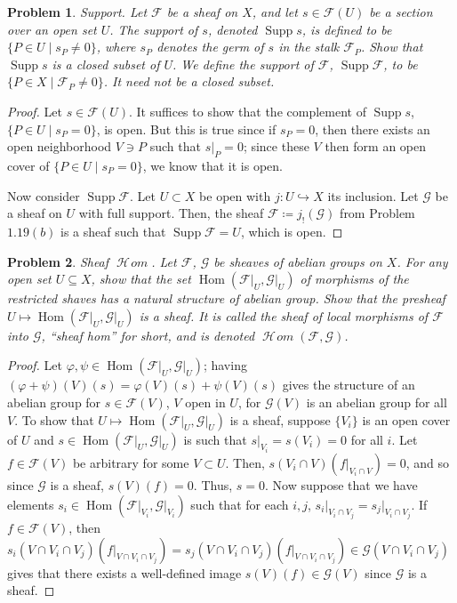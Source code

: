 \documentclass[12pt,letterpaper]{article}
\newtheorem{problem}{Problem}[section]
\theoremstyle{definition}
\theoremstyle{remark}
\numberwithin{equation}{section}
\numberwithin{figure}{problem}
\DeclareMathOperator{\Supp}{Supp}
\DeclareMathOperator{\Hom}{Hom}
\DeclareMathOperator{\HHom}{\mathscr{H}\!\mathit{om}}
\begin{document}
\begin{problem}
  \emph{Support}. Let $\mathscr{F}$ be a sheaf on $X$, and let $s \in \mathscr{F}(U)$ be a section over an open set $U$. The \emph{support} of $s$, denoted $\Supp s$, is defined to be $\{P \in U \mid s_P \ne 0\}$, where $s_P$ denotes the germ of $s$ in the stalk $\mathscr{F}_P$. Show that $\Supp s$ is a closed subset of $U$. We define the \emph{support} of $\mathscr{F}$, $\Supp \mathscr{F}$, to be $\{P \in X \mid \mathscr{F}_P \ne 0\}$. It need not be a closed subset.
\end{problem}
\begin{proof}
  Let $s \in \mathscr{F}(U)$. It suffices to show that the complement of $\Supp s$, $\{P \in U \mid s_P = 0\}$, is open. But this is true since if $s_P = 0$, then there exists an open neighborhood $V \ni P$ such that $s\vert_P = 0$; since these $V$ then form an open cover of $\{P \in U \mid s_P = 0\}$, we know that it is open.
  \par Now consider $\Supp\mathscr{F}$. Let $U \subset X$ be open with $j\colon U \hookrightarrow X$ its inclusion. Let $\mathscr{G}$ be a sheaf on $U$ with full support. Then, the sheaf $\mathscr{F} \coloneqq j_!(\mathscr{G})$ from Problem $1.19(b)$ is a sheaf such that $\Supp\mathscr{F} = U$, which is open.
\end{proof}

\begin{problem}
  \emph{Sheaf $\HHom$}. Let $\mathscr{F}$, $\mathscr{G}$ be sheaves of abelian groups on $X$. For any open set $U \subseteq X$, show that the set $\Hom(\mathscr{F}\vert_U,\mathscr{G}\vert_U)$ of morphisms of the restricted shaves has a natural structure of abelian group. Show that the presheaf $U \mapsto \Hom(\mathscr{F}\vert_U,\mathscr{G}\vert_U)$ is a sheaf. It is called the \emph{sheaf of local morphisms} of $\mathscr{F}$ into $\mathscr{G}$, ``sheaf hom'' for short, and is denoted $\HHom(\mathscr{F},\mathscr{G})$.
\end{problem}
\begin{proof}
  Let $\varphi,\psi \in \Hom(\mathscr{F}\vert_U,\mathscr{G}\vert_U)$; having $(\varphi + \psi)(V)(s) = \varphi(V)(s) + \psi(V)(s)$ gives the structure of an abelian group for $s \in \mathscr{F}(V)$, $V$ open in $U$, for $\mathscr{G}(V)$ is an abelian group for all $V$. To show that $U \mapsto \Hom(\mathscr{F}\vert_U,\mathscr{G}\vert_U)$ is a sheaf, suppose $\{V_i\}$ is an open cover of $U$ and $s \in \Hom(\mathscr{F}\vert_U,\mathscr{G}\vert_U)$ is such that $s\vert_{V_i} = s(V_i) = 0$ for all $i$. Let $f \in \mathscr{F}(V)$ be arbitrary for some $V \subset U$. Then, $s(V_i \cap V)(f\vert_{V_i \cap V}) = 0$, and so since $\mathscr{G}$ is a sheaf, $s(V)(f) = 0$. Thus, $s = 0$. Now suppose that we have elements $s_i \in \Hom(\mathscr{F}\vert_{V_i},\mathscr{G}\vert_{V_i})$ such that for each $i,j$, $s_i\vert_{V_i \cap V_j} = s_j\vert_{V_i \cap V_j}$. If $f \in \mathscr{F}(V)$, then $s_i(V \cap V_i \cap V_j)(f\vert_{V \cap V_i \cap V_j}) = s_j(V \cap V_i \cap V_j)(f\vert_{V \cap V_i \cap V_j}) \in \mathscr{G}(V \cap V_i \cap V_j)$ gives that there exists a well-defined image $s(V)(f) \in \mathscr{G}(V)$ since $\mathscr{G}$ is a sheaf.
\end{proof}
\end{document}
